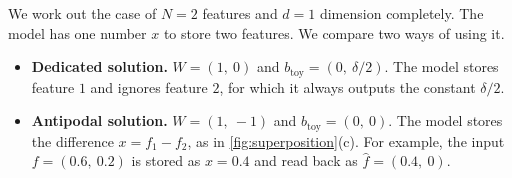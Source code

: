 We work out the case of $N=2$ features and $d=1$ dimension completely. The model has one number $x$ to store
two features. We compare two ways of using it.

\begin{itemize}
\item \textbf{Dedicated solution.} $W=(1,\ 0)$ and $b_{\mathrm{toy}}=(0,\ \delta/2)$. The model stores feature $1$
and ignores feature $2$, for which it always outputs the constant $\delta/2$.
\item \textbf{Antipodal solution.} $W=(1,\ -1)$ and $b_{\mathrm{toy}}=(0,\ 0)$. The model stores the difference
$x=f_1-f_2$, as in \cref{fig:superposition}(c). For example, the input $f=(0.6,\ 0.2)$ is stored as $x=0.4$ and read
back as $\hat f=(0.4,\ 0)$.
\end{itemize}

